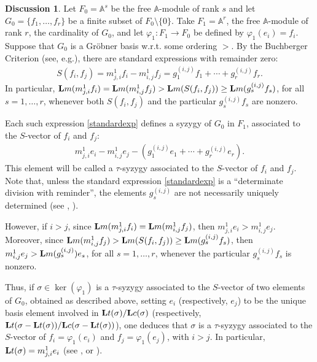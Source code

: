 \documentclass[10pt]{amsart}
\newcommand{\eg}{e.g.}
\newcommand{\mba}{\mbox{$\mathbb{A}$}}
\newcommand{\lc}{\mbox{${\bf L}{\rm c}$}}
\newcommand{\lm}{\mbox{${\bf L}{\rm m}$}}
\newcommand{\lt}{\mbox{${\bf L}{\rm t}$}}
\theoremstyle{definition}
\newtheorem{discussion}[cdrthm]{Discussion}
\theoremstyle{remark}
\begin{document}
\begin{discussion}\label{disc}
Let $F_0=\mba^s$ be the free $\mba$-module of rank $s$ and let
$G_0=\{f_1,\ldots ,f_r\}$ be a finite subset of
$F_0\setminus\{0\}$. Take $F_1=\mba^r$, the free $\mba$-module of rank
$r$, the cardinality of $G_0$, and let $\varphi_1:F_1\rightarrow F_0$
be defined by $\varphi_1(e_i)=f_i$. Suppose that $G_0$ is a Gr\"obner
basis w.r.t. some ordering $>$. By the Buchberger Criterion (see,
\eg \cite[Theorem~15.8]{eisenbud}), there are standard
expressions with remainder zero:
\begin{eqnarray}\label{standardexp}
S(f_i,f_j)=m^1_{j,i}f_i-m^1_{i,j}f_j=g_1^{(i,j)}f_1+\cdots
+g_r^{(i,j)}f_r.
\end{eqnarray}
In particular, $\lm(m^1_{j,i}f_i)=\lm(m^1_{i,j}f_j)>\lm(S(f_i,f_j))
\geq \lm(g_s^{(i,j)}f_s)$, for all $s=1,\ldots, r$, whenever both
$S(f_i,f_j)$ and the particular $g_s^{(i,j)}f_s$ are nonzero.

Each such expression \eqref{standardexp} defines a syzygy of $G_0$ in
$F_1$, associated to the $S$-vector of $f_i$ and $f_j$:
\begin{eqnarray}\label{syzygy}
m^1_{j,i}e_i-m^1_{i,j}e_j-(g_1^{(i,j)}e_1+\cdots
+g_r^{(i,j)}e_r).
\end{eqnarray}
This element will be called a $\tau$-syzygy associated to the
$S$-vector of $f_i$ and $f_j$. Note that, unless the standard
expression \eqref{standardexp} is a ``determinate division with
reminder'', the elements $g_s^{(i,j)}$ are not necessarily uniquely
determined (see \cite[Theorem~1.3]{bs}, \cite[Theorem~2.2.12]{ds}).

However, if $i>j$, since $\lm(m^1_{j,i}f_i)=\lm(m^1_{i,j}f_j)$, then
$m^1_{j,i}e_i>m^1_{i,j}e_j$.  Moreover, since
$\lm(m^1_{i,j}f_j)>\lm(S(f_i,f_j))\geq \lm(g_s^{(i,j)}f_s)$, then
$m^1_{i,j}e_j>\lm(g_s^{(i,j)})e_s$, for all $s=1,\ldots ,r$, whenever
the particular $g_s^{(i,j)}f_s$ is nonzero.

Thus, if $\sigma\in\ker(\varphi_1)$ is a $\tau$-syzygy associated to
the $S$-vector of two elements of $G_0$, obtained as described above,
setting $e_i$ (respectively, $e_j$) to be the unique basis element
involved in $\lt(\sigma)/\lc(\sigma)$ (respectively, 
$\lt(\sigma-\lt(\sigma))/\lc(\sigma-\lt(\sigma))$), one deduces
that $\sigma$ is a $\tau$-syzygy associated to the $S$-vector of
$f_i=\varphi_1(e_i)$ and $f_j=\varphi_1(e_j)$, with $i>j$. In
particular, $\lt(\sigma)=m^1_{j,i}e_i$ (see \cite[p.6]{bs},
\cite[p.68]{ds} or \cite[Remark~3.6]{emss}).


\end{discussion}
\end{document}
